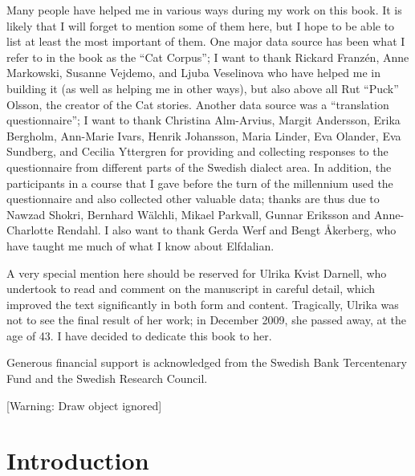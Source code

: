 Many people have helped me in various ways during my work on this book. It is likely that I will forget to mention some of them here, but I hope to be able to list at least the most important of them. One major data source has been what I refer to in the book as the “Cat Corpus”; I want to thank Rickard Franzén, Anne Markowski, Susanne Vejdemo, and Ljuba Veselinova who have helped me in building it (as well as helping me in other ways), but also above all Rut “Puck” Olsson, the creator of the Cat stories. Another data source was a “translation questionnaire”; I want to thank Christina Alm-Arvius, Margit Andersson, Erika Bergholm, Ann-Marie Ivars, Henrik Johansson, Maria Linder, Eva Olander, Eva Sundberg, and Cecilia Yttergren for providing and collecting responses to the questionnaire from different parts of the Swedish dialect area. In addition, the participants in a course that I gave before the turn of the millennium used the questionnaire and also collected other valuable data; thanks are thus due to Nawzad Shokri, Bernhard Wälchli, Mikael Parkvall, Gunnar Eriksson and Anne-Charlotte Rendahl. I also want to thank Gerda Werf and Bengt Åkerberg, who have taught me much of what I know about Elfdalian. 

A very special mention here should be reserved for Ulrika Kvist Darnell, who undertook to read and comment on the manuscript in careful detail, which improved the text significantly in both form and content. Tragically, Ulrika was not to see the final result of her work; in December 2009, she passed away, at the age of 43. I have decided to dedicate this book to her. 

Generous financial support is acknowledged from the Swedish Bank Tercentenary Fund and the Swedish Research Council.

[Warning: Draw object ignored]

\section[Introduction]{\rmfamily Introduction}
